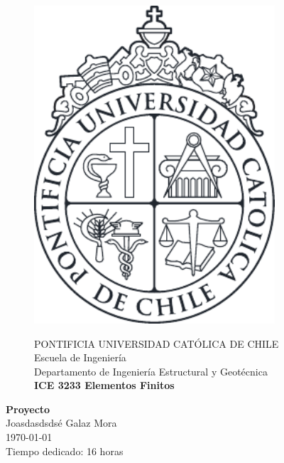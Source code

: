 \documentclass[10pt]{article}
\theoremstyle{definition}
\theoremstyle{remark}
\theoremstyle{definition}
\begin{document}
%   
  \begin{titlepage}
    \begin{figure}
      \begin{minipage}{2.5cm}
	\includegraphics[width=0.8\textwidth]{./figuras/LogoUC-BN}
      \end{minipage}
      \begin{minipage}{14.5cm}
	\vspace{4mm}
	{\sc PONTIFICIA UNIVERSIDAD CAT\'OLICA DE CHILE}\\
	Escuela de Ingenier\'ia\\
	Departamento de Ingenier\'ia Estructural y Geot\'ecnica\\
	{\bf ICE 3233 Elementos Finitos}\\
	\vspace{0mm}
	\hrulefill
      \end{minipage}
    \end{figure}
    \phantom{""}\vspace{60mm}

    \begin{center}
      \Huge{\textbf{Proyecto}}\vspace{95mm}\\
      \raggedleft \Large{Joasdasdsds\'e Galaz Mora}\\ \today\\ Tiempo dedicado: 16 horas
    \end{center}
  \end{titlepage}
  
\end{document}
